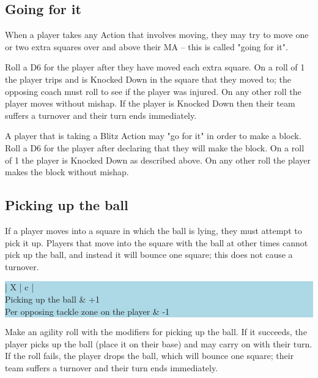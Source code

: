 \documentclass{article}
\begin{document}
\begin{multicols}{2}
\subsection{Going for it}
\par When a player takes any Action that involves moving, they may try to move one or two extra squares over and above their MA -- this is called "going for it".
\par Roll a D6 for the player after they have moved each extra square. On a roll of 1 the player trips and is Knocked Down in the square that they moved to; the opposing coach must roll to see if the player was injured. On any other roll the player moves without mishap. If the player is Knocked Down then their team suffers a turnover and their turn ends immediately.
\par A player that is taking a Blitz Action may "go for it" in order to make a block. Roll a D6 for the player after declaring that they will make the block. On a roll of 1 the player is Knocked Down as described above. On any other roll the player makes the block without mishap.

\subsection{Picking up the ball}
\par If a player moves into a square in which the ball is lying, they must attempt to pick it up. Players that move into the square with the ball at other times cannot pick up the ball, and instead it will bounce one square; this does not cause a turnover.

\medskip
\begingroup\setlength{\fboxsep}{0pt}\colorbox{lightBlue}{%
\begin{tabularx}{\linewidth}{ | X | c | }
\hline
{} \\
\hline
Picking up the ball & +1 \\
\hline
Per opposing tackle zone on the player & -1 \\
\hline
\end{tabularx}%
}\endgroup
\medskip

\par Make an agility roll with the modifiers for picking up the ball. If it succeeds, the player picks up the ball (place it on their base) and may carry on with their turn. If the roll fails, the player drops the ball, which will bounce one square; their team suffers a turnover and their turn ends immediately.


\end{multicols}
\end{document}
